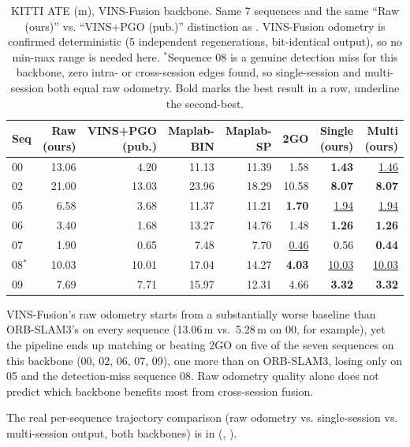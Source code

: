 \begin{table}[htb]
  \centering
  \footnotesize
  \begin{tabular*}{\textwidth}{@{\extracolsep{\fill}} lrrrrrrr}
  \hline
  \textbf{Seq} & \textbf{Raw (ours)} & \textbf{VINS+PGO (pub.)} & \textbf{Maplab-BIN} & \textbf{Maplab-SP} & \textbf{2GO} & \textbf{Single (ours)} & \textbf{Multi (ours)} \\
  \hline
  00 & 13.06 & 4.20 & 11.13 & 11.39 & 1.58 & \textbf{1.43} & \underline{1.46} \\
  02 & 21.00 & 13.03 & 23.96 & 18.29 & 10.58 & \textbf{8.07} & \textbf{8.07} \\
  05 & 6.58 & 3.68 & 11.37 & 11.21 & \textbf{1.70} & \underline{1.94} & \underline{1.94} \\
  06 & 3.40 & 1.68 & 13.27 & 14.76 & 1.48 & \textbf{1.26} & \textbf{1.26} \\
  07 & 1.90 & 0.65 & 7.48 & 7.70 & \underline{0.46} & 0.56 & \textbf{0.44} \\
  08$^{*}$ & 10.03 & 10.01 & 17.04 & 14.27 & \textbf{4.03} & \underline{10.03} & \underline{10.03} \\
  09 & 7.69 & 7.71 & 15.97 & 12.31 & 4.66 & \textbf{3.32} & \textbf{3.32} \\
  \hline
  \end{tabular*}
  \caption[KITTI ATE, VINS-Fusion backbone]{KITTI ATE (m), VINS-Fusion backbone. Same 7
    sequences and the same ``Raw (ours)'' vs. ``VINS+PGO (pub.)'' distinction as
    . VINS-Fusion odometry is confirmed deterministic (5
    independent regenerations, bit-identical output), so no min-max range is needed here.
    $^{*}$Sequence 08 is a genuine detection miss for this backbone, zero intra- or
    cross-session edges found, so single-session and multi-session both equal raw odometry. Bold marks the best result in a row, underline the second-best.}
  \label{tab:experiments-kitti-vins}
\end{table}

VINS-Fusion's raw odometry starts from a substantially worse baseline than ORB-SLAM3's on every
sequence (13.06\,m vs.\ 5.28\,m on 00, for example), yet the pipeline ends up matching or beating
2GO on five of the seven sequences on this backbone (00, 02, 06, 07, 09), one more than on
ORB-SLAM3, losing only on 05 and the detection-miss sequence 08. Raw odometry quality alone does
not predict which backbone benefits most from cross-session fusion.

The real per-sequence trajectory comparison (raw odometry vs. single-session vs. multi-session
output, both backbones) is in 
(, ).

